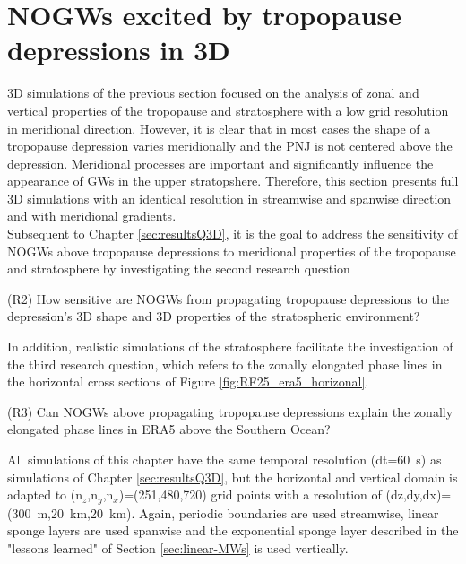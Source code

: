 \chapter{NOGWs excited by tropopause depressions in 3D}
\label{sec:results3D}
3D simulations of the previous section focused on the analysis of zonal and vertical properties of the tropopause and stratosphere with a low grid resolution in meridional direction. However, it is clear that in most cases the shape of a tropopause depression varies meridionally and the PNJ is not centered above the depression. Meridional processes are important and significantly influence the appearance of GWs in the upper stratopshere. Therefore, this section presents full 3D simulations with an identical resolution in streamwise and spanwise direction and with meridional gradients. \\
Subsequent to Chapter \ref{sec:resultsQ3D}, it is the goal to address the sensitivity of NOGWs above tropopause depressions to meridional properties of the tropopause and stratosphere by investigating the second research question
\begin{tcolorbox}[]
    (R2) How sensitive are NOGWs from propagating tropopause depressions to the depression's 3D shape and 3D properties of the stratospheric environment?
\end{tcolorbox}
In addition, realistic simulations of the stratosphere facilitate the investigation of the third research question, which refers to the zonally elongated phase lines in the horizontal cross sections of Figure \ref{fig:RF25_era5_horizonal}.
\begin{tcolorbox}[]
    (R3) Can NOGWs above propagating tropopause depressions explain the zonally elongated phase lines in ERA5 above the Southern Ocean?
\end{tcolorbox} 
All simulations of this chapter have the same temporal resolution (dt=\SI{60}{\second}) as simulations of Chapter \ref{sec:resultsQ3D}, but the horizontal and vertical domain is adapted to (n$_z$,n$_y$,n$_x$)=(251,480,720) grid points with a resolution of (dz,dy,dx)=(\SI{300}{\meter},\SI{20}{\kilo\meter},\SI{20}{\kilo\meter}). Again, periodic boundaries are used streamwise, linear sponge layers are used spanwise and the exponential sponge layer described in the "lessons learned" of Section \ref{sec:linear-MWs} is used vertically.

